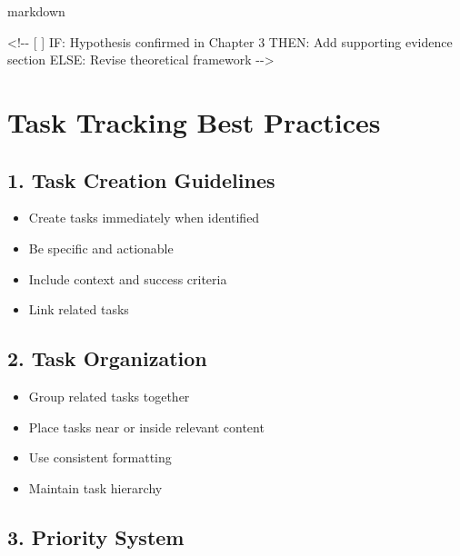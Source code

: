 \documentclass[
  11pt,
  letterpaper,
]{book}
\newenvironment{Shaded}{\begin{snugshade}}{\end{snugshade}}
\newcommand{\CommentTok}[1]{\textcolor[rgb]{0.37,0.37,0.37}{#1}}
\providecommand{\tightlist}{%
  \setlength{\itemsep}{0pt}\setlength{\parskip}{0pt}}
\begin{document}
markdown

\begin{Shaded}
\begin{Highlighting}[]
\CommentTok{\textless{}!{-}{-} [ ] IF: Hypothesis confirmed in Chapter 3}
\CommentTok{     THEN: Add supporting evidence section}
\CommentTok{     ELSE: Revise theoretical framework {-}{-}\textgreater{}}
\end{Highlighting}
\end{Shaded}

\section*{Task Tracking Best
Practices}\label{task-tracking-best-practices}


\subsection*{1. Task Creation
Guidelines}\label{task-creation-guidelines}

\begin{itemize}
\tightlist
\item
  Create tasks immediately when identified
\item
  Be specific and actionable
\item
  Include context and success criteria
\item
  Link related tasks
\end{itemize}

\subsection*{2. Task Organization}\label{task-organization}

\begin{itemize}
\tightlist
\item
  Group related tasks together
\item
  Place tasks near or inside relevant content
\item
  Use consistent formatting
\item
  Maintain task hierarchy
\end{itemize}

\subsection*{3. Priority System}\label{priority-system}
\end{document}
